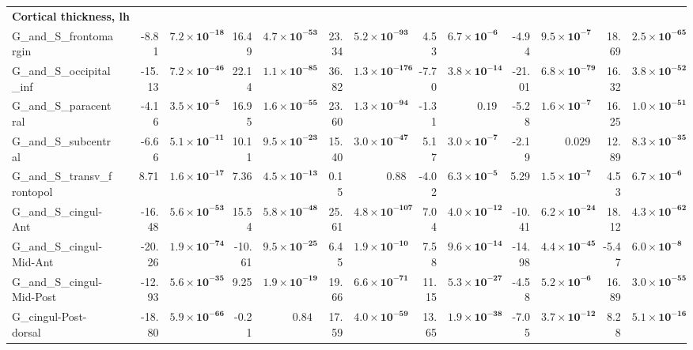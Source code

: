 {\begin{longtable}{llrrrrrrrrrrrr}
\midrule\multicolumn{14}{l}{\textbf{Cortical thickness, lh}} \\
G\_and\_S\_frontomargin &  & -8.81 & $\mathbf{7.2{\times}10^{-18}}$ & 16.49 & $\mathbf{4.7{\times}10^{-53}}$ & 23.34 & $\mathbf{5.2{\times}10^{-93}}$ & 4.53 & $\mathbf{6.7{\times}10^{-6}}$ & -4.94 & $\mathbf{9.5{\times}10^{-7}}$ & 18.69 & $\mathbf{2.5{\times}10^{-65}}$ \\
G\_and\_S\_occipital\_inf &  & -15.13 & $\mathbf{7.2{\times}10^{-46}}$ & 22.14 & $\mathbf{1.1{\times}10^{-85}}$ & 36.82 & $\mathbf{1.3{\times}10^{-176}}$ & -7.70 & $\mathbf{3.8{\times}10^{-14}}$ & -21.01 & $\mathbf{6.8{\times}10^{-79}}$ & 16.32 & $\mathbf{3.8{\times}10^{-52}}$ \\
G\_and\_S\_paracentral &  & -4.16 & $\mathbf{3.5{\times}10^{-5}}$ & 16.95 & $\mathbf{1.6{\times}10^{-55}}$ & 23.60 & $\mathbf{1.3{\times}10^{-94}}$ & -1.31 & $0.19$ & -5.28 & $\mathbf{1.6{\times}10^{-7}}$ & 16.25 & $\mathbf{1.0{\times}10^{-51}}$ \\
G\_and\_S\_subcentral &  & -6.66 & $\mathbf{5.1{\times}10^{-11}}$ & 10.11 & $\mathbf{9.5{\times}10^{-23}}$ & 15.40 & $\mathbf{3.0{\times}10^{-47}}$ & 5.17 & $\mathbf{3.0{\times}10^{-7}}$ & -2.19 & $0.029$ & 12.89 & $\mathbf{8.3{\times}10^{-35}}$ \\
G\_and\_S\_transv\_frontopol &  & 8.71 & $\mathbf{1.6{\times}10^{-17}}$ & 7.36 & $\mathbf{4.5{\times}10^{-13}}$ & 0.15 & $0.88$ & -4.02 & $\mathbf{6.3{\times}10^{-5}}$ & 5.29 & $\mathbf{1.5{\times}10^{-7}}$ & 4.53 & $\mathbf{6.7{\times}10^{-6}}$ \\
G\_and\_S\_cingul-Ant &  & -16.48 & $\mathbf{5.6{\times}10^{-53}}$ & 15.54 & $\mathbf{5.8{\times}10^{-48}}$ & 25.61 & $\mathbf{4.8{\times}10^{-107}}$ & 7.04 & $\mathbf{4.0{\times}10^{-12}}$ & -10.41 & $\mathbf{6.2{\times}10^{-24}}$ & 18.12 & $\mathbf{4.3{\times}10^{-62}}$ \\
G\_and\_S\_cingul-Mid-Ant &  & -20.26 & $\mathbf{1.9{\times}10^{-74}}$ & -10.61 & $\mathbf{9.5{\times}10^{-25}}$ & 6.45 & $\mathbf{1.9{\times}10^{-10}}$ & 7.58 & $\mathbf{9.6{\times}10^{-14}}$ & -14.98 & $\mathbf{4.4{\times}10^{-45}}$ & -5.47 & $\mathbf{6.0{\times}10^{-8}}$ \\
G\_and\_S\_cingul-Mid-Post &  & -12.93 & $\mathbf{5.6{\times}10^{-35}}$ & 9.25 & $\mathbf{1.9{\times}10^{-19}}$ & 19.66 & $\mathbf{6.6{\times}10^{-71}}$ & 11.15 & $\mathbf{5.3{\times}10^{-27}}$ & -4.58 & $\mathbf{5.2{\times}10^{-6}}$ & 16.89 & $\mathbf{3.0{\times}10^{-55}}$ \\
G\_cingul-Post-dorsal &  & -18.80 & $\mathbf{5.9{\times}10^{-66}}$ & -0.21 & $0.84$ & 17.59 & $\mathbf{4.0{\times}10^{-59}}$ & 13.65 & $\mathbf{1.9{\times}10^{-38}}$ & -7.05 & $\mathbf{3.7{\times}10^{-12}}$ & 8.28 & $\mathbf{5.1{\times}10^{-16}}$ \\

\end{longtable}}
